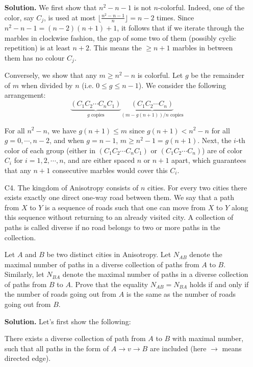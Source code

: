 \documentclass[11pt,a4paper]{article}
\begin{document}
\begin{enumerate}
		\textbf{Solution.} 
		We first show that $n^2-n-1$ is not $n$-colorful. 
		Indeed, one of the color, say $C_j$, is used at most $\lfloor \frac{n^2-n-1}{n}\rfloor = n-2$ times. 
		Since $n^2-n-1=(n-2)(n+1)+1$, it follows that if we iterate through the marbles in clockwise fashion, the gap of some two of them (possibly cyclic repetition) is at least $n+2$. 
		This means the $\ge n+1$ marbles in between them has no colour $C_j$. 
		
		Conversely, we show that any $m\ge n^2-n$ is colorful. 
		Let $g$ be the remainder of $m$ when divided by $n$ (i.e. $0\le g\le n - 1$). 
		We consider the following arrangement: 
		\[
		\underbrace{(C_1C_2\cdots C_nC_1)}_{g \text{ copies}}
		\underbrace{(C_1C_2\cdots C_n)}_{(m - g(n + 1))/n\text{ copies}}
		\]
		
		For all $n^2-n$, we have $g(n+1)\le m$ since $g(n+1) < n^2-n$ for all $g=0, \cdots, n-2$, 
		and when $g=n-1$, $m\ge n^2-1=g(n+1)$. 
		Next, the $i$-th color of each group (either in $(C_1C_2\cdots C_nC_1)$ or $(C_1C_2\cdots C_n)$) are of color $C_i$ for $i=1, 2, \cdots, n$, 
		and are either spaced $n$ or $n+1$ apart, 
		which guarantees that any $n+1$ consecutive marbles would cover this $C_i$. 
		
		\item [C4.] 
		The kingdom of Anisotropy consists of $n$ cities. For every two cities there exists exactly one direct one-way road between them. We say that a path from $X$ to $Y$ is a sequence of roads such that one can move from $X$ to $Y$ along this sequence without returning to an already visited city. A collection of paths is called diverse if no road belongs to two or more paths in the collection.
		
		Let $A$ and $B$ be two distinct cities in Anisotropy. Let $N_{AB}$ denote the maximal number of paths in a diverse collection of paths from $A$ to $B$. Similarly, let $N_{BA}$ denote the maximal number of paths in a diverse collection of paths from $B$ to $A$. Prove that the equality $N_{AB} = N_{BA}$ holds if and only if the number of roads going out from $A$ is the same as the number of roads going out from $B$.
		
		\textbf{Solution.} 
		Let's first show the following: 
		\begin{lemma}
			\label{lemma_c4a}
			There exists a diverse collection of path from $A$ to $B$ with maximal number, 
			such that all paths in the form of $A\to v\to B$ are included (here $\to$ means directed edge). 
		\end{lemma}
		

\end{enumerate}
\end{document}
